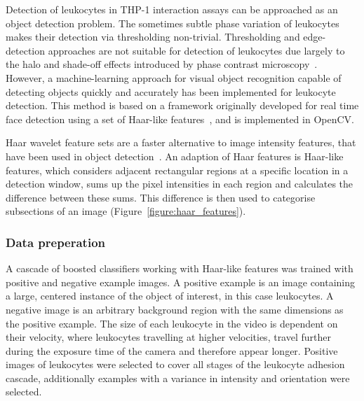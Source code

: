 Detection of leukocytes in THP-1 interaction assays can be approached as an object detection problem. The sometimes subtle phase variation of leukocytes makes their detection via thresholding non-trivial. Thresholding and edge-detection approaches are not suitable for detection of leukocytes due largely to the halo and shade-off effects introduced by phase contrast microscopy~\cite{Yin2012}. However, a machine-learning approach for visual object recognition capable of detecting objects quickly and accurately has been implemented for leukocyte detection. This method is based on a framework originally developed for real time face detection using a set of Haar-like features~\cite{Viola2001, Lienhart2002}, and is implemented in OpenCV.

Haar wavelet feature sets are a faster alternative to image intensity features, that have been used in object detection~\cite{Papageorgiou1998}. An adaption of Haar features is Haar-like features, which considers adjacent rectangular regions at a specific location in a detection window, sums up the pixel intensities in each region and calculates the difference between these sums. This difference is then used to categorise subsections of an image (Figure~\ref{figure:haar_features}).

\subsubsection{Data preperation}
A cascade of boosted classifiers working with Haar-like features was trained with positive and negative example images. A positive example is an image containing a large, centered instance of the object of interest, in this case leukocytes. A negative image is an arbitrary background region with the same dimensions as the positive example. The size of each leukocyte in the video is dependent on their velocity, where leukocytes travelling at higher velocities, travel further during the exposure time of the camera and therefore appear longer. Positive images of leukocytes were selected to cover all stages of the leukocyte adhesion cascade, additionally examples with a variance in intensity and orientation were selected.

